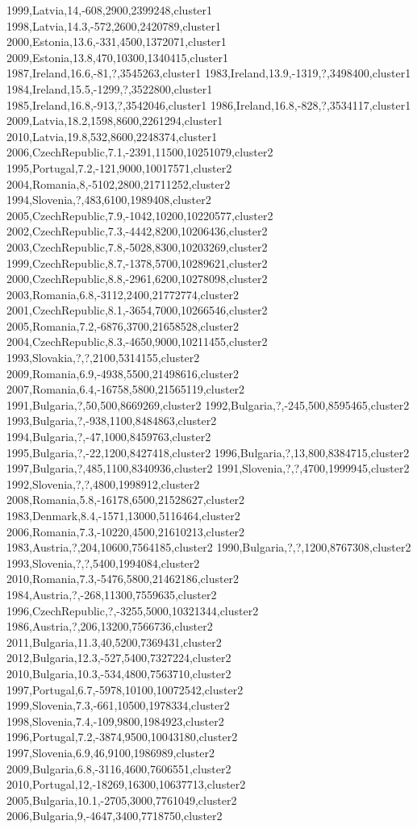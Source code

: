 1999,Latvia,14,-608,2900,2399248,cluster1
1998,Latvia,14.3,-572,2600,2420789,cluster1
2000,Estonia,13.6,-331,4500,1372071,cluster1
2009,Estonia,13.8,470,10300,1340415,cluster1
1987,Ireland,16.6,-81,?,3545263,cluster1
1983,Ireland,13.9,-1319,?,3498400,cluster1
1984,Ireland,15.5,-1299,?,3522800,cluster1
1985,Ireland,16.8,-913,?,3542046,cluster1
1986,Ireland,16.8,-828,?,3534117,cluster1
2009,Latvia,18.2,1598,8600,2261294,cluster1
2010,Latvia,19.8,532,8600,2248374,cluster1
2006,CzechRepublic,7.1,-2391,11500,10251079,cluster2
1995,Portugal,7.2,-121,9000,10017571,cluster2
2004,Romania,8,-5102,2800,21711252,cluster2
1994,Slovenia,?,483,6100,1989408,cluster2
2005,CzechRepublic,7.9,-1042,10200,10220577,cluster2
2002,CzechRepublic,7.3,-4442,8200,10206436,cluster2
2003,CzechRepublic,7.8,-5028,8300,10203269,cluster2
1999,CzechRepublic,8.7,-1378,5700,10289621,cluster2
2000,CzechRepublic,8.8,-2961,6200,10278098,cluster2
2003,Romania,6.8,-3112,2400,21772774,cluster2
2001,CzechRepublic,8.1,-3654,7000,10266546,cluster2
2005,Romania,7.2,-6876,3700,21658528,cluster2
2004,CzechRepublic,8.3,-4650,9000,10211455,cluster2
1993,Slovakia,?,?,2100,5314155,cluster2
2009,Romania,6.9,-4938,5500,21498616,cluster2
2007,Romania,6.4,-16758,5800,21565119,cluster2
1991,Bulgaria,?,50,500,8669269,cluster2
1992,Bulgaria,?,-245,500,8595465,cluster2
1993,Bulgaria,?,-938,1100,8484863,cluster2
1994,Bulgaria,?,-47,1000,8459763,cluster2
1995,Bulgaria,?,-22,1200,8427418,cluster2
1996,Bulgaria,?,13,800,8384715,cluster2
1997,Bulgaria,?,485,1100,8340936,cluster2
1991,Slovenia,?,?,4700,1999945,cluster2
1992,Slovenia,?,?,4800,1998912,cluster2
2008,Romania,5.8,-16178,6500,21528627,cluster2
1983,Denmark,8.4,-1571,13000,5116464,cluster2
2006,Romania,7.3,-10220,4500,21610213,cluster2
1983,Austria,?,204,10600,7564185,cluster2
1990,Bulgaria,?,?,1200,8767308,cluster2
1993,Slovenia,?,?,5400,1994084,cluster2
2010,Romania,7.3,-5476,5800,21462186,cluster2
1984,Austria,?,-268,11300,7559635,cluster2
1996,CzechRepublic,?,-3255,5000,10321344,cluster2
1986,Austria,?,206,13200,7566736,cluster2
2011,Bulgaria,11.3,40,5200,7369431,cluster2
2012,Bulgaria,12.3,-527,5400,7327224,cluster2
2010,Bulgaria,10.3,-534,4800,7563710,cluster2
1997,Portugal,6.7,-5978,10100,10072542,cluster2
1999,Slovenia,7.3,-661,10500,1978334,cluster2
1998,Slovenia,7.4,-109,9800,1984923,cluster2
1996,Portugal,7.2,-3874,9500,10043180,cluster2
1997,Slovenia,6.9,46,9100,1986989,cluster2
2009,Bulgaria,6.8,-3116,4600,7606551,cluster2
2010,Portugal,12,-18269,16300,10637713,cluster2
2005,Bulgaria,10.1,-2705,3000,7761049,cluster2
2006,Bulgaria,9,-4647,3400,7718750,cluster2
